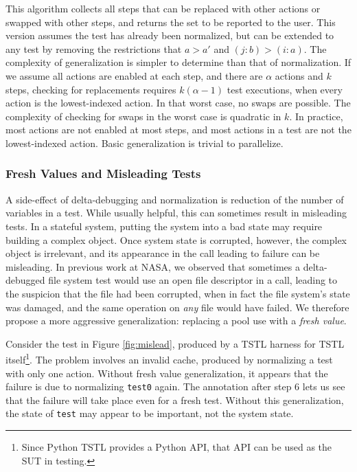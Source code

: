 This algorithm collects all steps that can be replaced with other
actions or swapped with other steps, and returns the set to be
reported to the user.  This version assumes the test has already been
normalized, but can be extended to any test by removing the
restrictions that $a > a'$ and $(j : b) > (i : a)$.  The complexity of
generalization is simpler to determine than that of normalization.  If
we assume all actions are enabled at each step, and there are $\alpha$
actions and $k$ steps, checking for replacements requires $k (\alpha-1)$
test executions, when every action is the lowest-indexed action.
In that worst case, no swaps are possible.  The complexity of checking
for swaps in the worst case is quadratic in $k$.  In practice, most
actions are not enabled at most steps, and most actions in a test
are not the lowest-indexed action.  Basic generalization is trivial to
parallelize.


\subsubsection{Fresh Values and Misleading Tests}
\label{freshgen}

A side-effect of delta-debugging and normalization is reduction of the
number of variables in a test.  While usually helpful, this can
sometimes result in misleading tests.  In a stateful system,
putting the system into a bad state may require building a complex
object.  Once system state is corrupted, however, the complex object
is irrelevant, and its appearance in the call leading to failure can
be misleading.  In previous work at NASA, we observed that sometimes a
delta-debugged file system test \cite{ICSEDiff,AMAI} would use an
open file descriptor in a call, leading to the suspicion that the file
had been corrupted, when in fact the file system's state was damaged,
and the same operation on \emph{any} file would have failed.
We therefore propose a more aggressive generalization: replacing a pool use with a \emph{fresh value}.

Consider the test in Figure \ref{fig:mislead}, produced by a
TSTL harness for  TSTL itself\footnote{Since Python TSTL
  provides a Python API, that API can be used as the SUT in testing.}.  The
problem involves an invalid cache, produced by normalizing a test with
only one action.  Without fresh value generalization, it appears that
the failure is due to normalizing {\tt test0} again.
The annotation after step 6 lets us see that the failure
will take place even for a fresh test.
Without this generalization, the state of {\tt test} may
appear to be important, not the system state.

